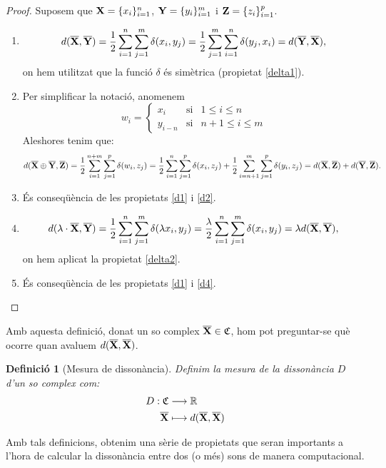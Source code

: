 \documentclass{article}
\theoremstyle{math}
\newtheorem{definition}{Definició}[section]
\newcommand{\0}{\ensuremath{\vb{0}}}
\newcommand{\X}{\ensuremath{\vb{X}}}
\newcommand{\Y}{\ensuremath{\vb{Y}}}
\newcommand{\Z}{\ensuremath{\vb{Z}}}
\newcommand{\RR}{\ensuremath{\mathbb{R}}} %
\begin{document}
\begin{proof}
    Suposem que $\X=\{x_i\}_{i=1}^n$, $\Y=\{y_i\}_{i=1}^m$ i $\Z=\{z_i\}_{i=1}^p$.
    \begin{enumerate}[label=$d$\arabic*)]
        \item $$d(\overline{\X},\overline{\Y})=\frac{1}{2}\sum_{i=1}^n\sum_{j=1}^m\delta(x_i,y_j)=\frac{1}{2}\sum_{j=1}^m\sum_{i=1}^n\delta(y_j,x_i)=d(\overline{\Y},\overline{\X}),$$ on hem utilitzat que la funció $\delta$ és simètrica (propietat \ref{delta1}).
        \item Per simplificar la notació, anomenem 
        $$
        w_i=\left\{
        \begin{array}{ccc}
            x_i & \text{si} & 1\leq i\leq n\\
            y_{i-n} & \text{si} & n+1\leq i\leq m
        \end{array}\right.
        $$ Aleshores tenim que: $$d(\overline{\X}\oplus\overline{\Y},\overline{\Z})=\frac{1}{2}\sum_{i=1}^{n+m}\sum_{j=1}^p\delta(w_i,z_j)=\frac{1}{2}\sum_{i=1}^n\sum_{j=1}^p\delta(x_i,z_j)+\frac{1}{2}\sum_{i=n+1}^m\sum_{j=1}^p\delta(y_i,z_j)=d(\overline{\X},\overline{\Z})+d(\overline{\Y},\overline{\Z}).$$
        \item És conseqüència de les propietats \ref{d1} i \ref{d2}.
        \item $$d(\lambda\cdot\overline{\X},\overline{\Y})=\frac{1}{2}\sum_{i=1}^n\sum_{j=1}^m\delta(\lambda x_i,y_j)=\frac{\lambda}{2}\sum_{i=1}^n\sum_{j=1}^m\delta(x_i,y_j)=\lambda d(\overline{\X},\overline{\Y}),$$ on hem aplicat la propietat \ref{delta2}.
        \item És conseqüència de les propietats \ref{d1} i \ref{d4}.
    \end{enumerate}
\end{proof}
Amb aquesta definició, donat un so complex $\overline{\X}\in\mathfrak{C}$, hom pot preguntar-se què ocorre quan avaluem $d(\overline{\X},\overline{\X})$.
\begin{definition}[Mesura de dissonància]
    Definim la \textit{mesura de la dissonància $D$ d'un so complex} com:
    \begin{align*}
        D:\mathfrak{C}&\longrightarrow\RR\\
        \overline{\X}&\longmapsto d(\overline{\X},\overline{\X})
    \end{align*}
\end{definition}
Amb tals definicions, obtenim una sèrie de propietats que seran importants a l'hora de calcular la dissonància entre dos (o més) sons de manera computacional.
\end{document}
